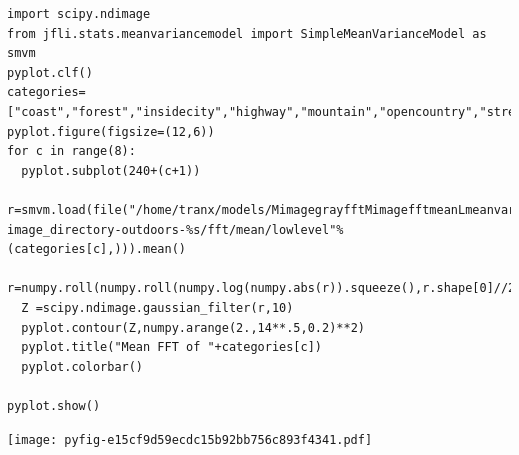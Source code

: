 \documentclass{report}
\begin{document}
\begin{lstlisting}
import scipy.ndimage
from jfli.stats.meanvariancemodel import SimpleMeanVarianceModel as smvm
pyplot.clf()
categories=["coast","forest","insidecity","highway","mountain","opencountry","street","tallbuilding"]
pyplot.figure(figsize=(12,6))
for c in range(8):
  pyplot.subplot(240+(c+1))
  r=smvm.load(file("/home/tranx/models/MimagegrayfftMimagefftmeanLmeanvariancemodelSimpleMeanVarianceModel-image_directory-outdoors-%s/fft/mean/lowlevel"%(categories[c],))).mean()
  r=numpy.roll(numpy.roll(numpy.log(numpy.abs(r)).squeeze(),r.shape[0]//2,axis=0),r.shape[0]//2,axis=1)
  Z =scipy.ndimage.gaussian_filter(r,10)
  pyplot.contour(Z,numpy.arange(2.,14**.5,0.2)**2)
  pyplot.title("Mean FFT of "+categories[c])
  pyplot.colorbar()

pyplot.show()

\end{lstlisting}















\noindent
\texttt{[image: pyfig-e15cf9d59ecdc15b92bb756c893f4341.pdf]}
\end{document}
